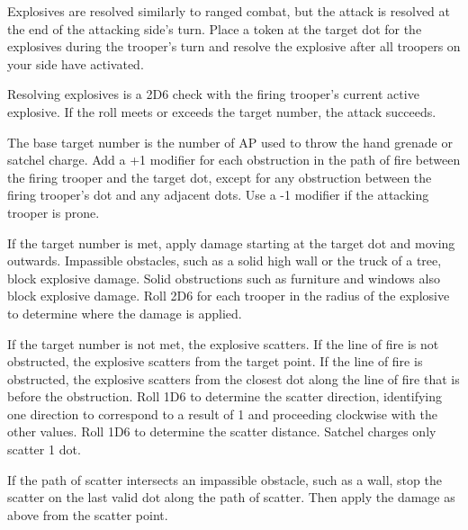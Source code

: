 Explosives are resolved similarly to ranged combat, but the attack is resolved at the end of the attacking side's turn.
Place a token at the target dot for the explosives during the trooper's turn and resolve the explosive after all troopers on your side have activated.

Resolving explosives is a 2D6 check with the firing trooper's current active explosive.
If the roll meets or exceeds the target number, the attack succeeds.

The base target number is the number of AP used to throw the hand grenade or satchel charge.
Add a +1 modifier for each obstruction in the path of fire between the firing trooper and the target dot, except for any obstruction between the firing trooper's dot and any adjacent dots.
Use a -1 modifier if the attacking trooper is prone.

If the target number is met, apply damage starting at the target dot and moving outwards.
Impassible obstacles, such as a solid high wall or the truck of a tree, block explosive damage.
Solid obstructions such as furniture and windows also block explosive damage.
Roll 2D6 for each trooper in the radius of the explosive to determine where the damage is applied.

If the target number is not met, the explosive scatters.
If the line of fire is not obstructed, the explosive scatters from the target point.
If the line of fire is obstructed, the explosive scatters from the closest dot along the line of fire that is before the obstruction.
Roll 1D6 to determine the scatter direction, identifying one direction to correspond to a result of 1 and proceeding clockwise with the other values.
Roll 1D6 to determine the scatter distance.
Satchel charges only scatter 1 dot.

If the path of scatter intersects an impassible obstacle, such as a wall, stop the scatter on the last valid dot along the path of scatter.
Then apply the damage as above from the scatter point.
